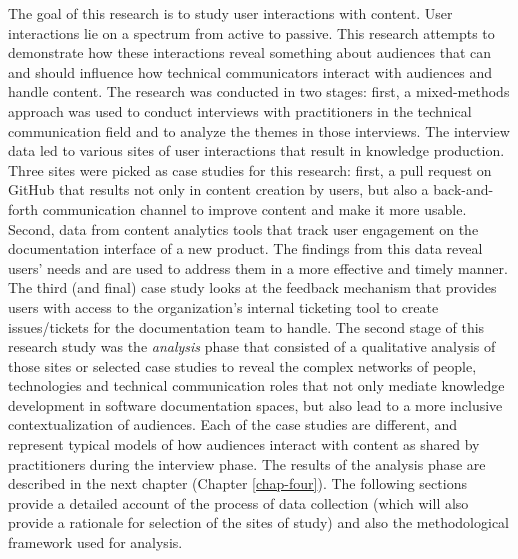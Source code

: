 The goal of this research is to study user interactions with content. User interactions lie on a spectrum from active to passive. This research attempts to demonstrate how these interactions reveal something about audiences that can and should influence how technical communicators interact with audiences and handle content. The research was conducted in two stages: first, a mixed-methods approach was used to conduct interviews with practitioners in the technical communication field and to analyze the themes in those interviews. The interview data led to various sites of user interactions that result in knowledge production. Three sites were picked as case studies for this research: first, a pull request on GitHub that results not only in content creation by users, but also a back-and-forth communication channel to improve content and make it more usable. Second, data from content analytics tools that track user engagement on the documentation interface of a new product. The findings from this data reveal users' needs and are used to address them in a more effective and timely manner. The third (and final) case study looks at the  feedback mechanism that provides users with access to the organization's internal ticketing tool to create issues/tickets for the documentation team to handle. The second stage of this research study was the \textit{analysis} phase that consisted of a qualitative analysis of those sites or selected case studies to reveal the complex networks of people, technologies and technical communication roles that not only mediate knowledge development in software documentation spaces, but also lead to a more inclusive contextualization of audiences. Each of the case studies are different, and represent typical models of how audiences interact with content as shared by practitioners during the interview phase. The results of the analysis phase are described in the next chapter (Chapter \ref{chap-four}). The following sections provide a detailed account of the process of data collection (which will also provide a rationale for selection of the sites of study) and also the methodological framework used for analysis.

